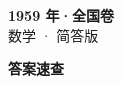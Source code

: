 \documentclass[zihao=-4, a4paper]{ctexart}
\begin{document}
\begin{center}
  {\Large\bfseries 1959 年·全国卷}\\[4pt]
  {\large 数学 · 简答版}
\end{center}
\medskip
{}

\clearpage
{}
\begin{center}{\Large\bfseries 答案速查}\end{center}
\medskip

\end{document}
